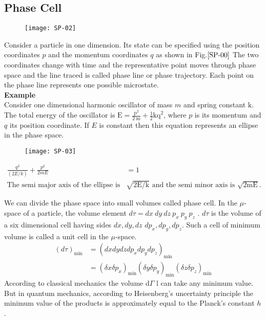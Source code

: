\subsection{Phase Cell}
\begin{figure}[H]
	\centering
	\texttt{[image: SP-02]}
	\caption{}
	\label{SP-00}
\end{figure}
\par Consider a particle in one dimension. Its state can be specified using the position coordinates $p$ and the momentum coordinates $q$ as shown in Fig.$\ref{SP-00}$ The two coordinates change with time and the representative point moves through phase space and the line traced is called phase line or phase trajectory. Each point on the phase line represents one possible microstate.\\
\textbf{Example}\\
Consider one dimensional harmonic oscillator of mass $m$ and spring constant $\mathrm{k}$. The total energy of the oscillator is $\mathrm{E}=\frac{\mathrm{p}^{2}}{2 \mathrm{~m}}+\frac{1}{2} \mathrm{kq}^{2}$, where $p$ is its momentum and $q$ its position coordinate. If $E$ is constant then this equation represents an ellipse in the phase space.
\begin{figure}[H]
	\centering
	\texttt{[image: SP-03]}
\end{figure}
\begin{align*}
\frac{q^{2}}{(2 E / k)}+\frac{p^{2}}{2 m E}&=1\\
\text{The semi major axis of the ellipse is }&\text{$\sqrt{2 \mathrm{E} / \mathrm{k}}$ and the semi minor axis is $\sqrt{2 \mathrm{mE}}$.}
\end{align*}
\par We can divide the phase space into small volumes called phase cell. In the $\mu$-space of a particle, the volume element $d \tau=d x\  d y \ d z\  p_{x}\  p_y \ p_z$ . $d\tau$  is the volume of a six dimensional cell having sides ${d x, d y, d z}$ $d p_{x}, d p_{y}, d p_{z}$. Such a cell of minimum volume is called a unit cell in the $\mu$-space.
\begin{align*}
(d \tau)_{\min }&=\left(d x d y d z d p_{x} d p_{y} d p_{z}\right)_{\min }\\
&=\left(\delta x \delta p_{x}\right)_{\min }\left(\delta y \delta p_{y}\right)_{\min }\left(\delta z \delta p_{z}\right)_{\min }
\end{align*}
According to classical mechanics the volume d$\Gamma$
l can take any minimum value. But in quantum mechanics, according to Heisenberg's uncertainty principle the minimum value of the products is approximately equal to the Planck's constant $h$.
